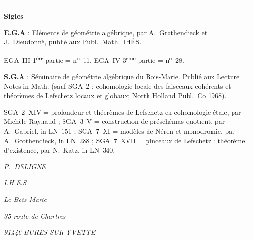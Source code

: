 \documentclass[12pt,a4paper]{article}
\theoremstyle{plain}
\theoremstyle{definition}
\theoremstyle{remark}
\begin{document}
\vspace{1em}

\begin{center}
\rule{0.6\textwidth}{0.4pt}
\end{center}

\vspace{0.5em}

\noindent\textbf{Sigles}

\medskip

\noindent\textbf{E.G.A} : Eléments de géométrie algébrique, par A.~Grothendieck et J.~Dieudonné, publié aux Publ.~Math.~IHÉS.

\noindent EGA~III 1\textsuperscript{ère} partie = n\textsuperscript{o}~11, EGA~IV 3\textsuperscript{ème} partie = n\textsuperscript{o}~28.

\medskip

\noindent\textbf{S.G.A} : Séminaire de géométrie algébrique du Bois-Marie. Publié aux Lecture Notes in Math. (sauf SGA~2 : cohomologie locale des faisceaux cohérents et théorèmes de Lefschetz locaux et globaux; North Holland Publ.~Co 1968).

\noindent SGA~2~XIV = profondeur et théorèmes de Lefschetz en cohomologie étale, par Michèle Raynaud ; SGA~3~V = construction de préschémas quotient, par A.~Gabriel, in LN~151 ; SGA~7~XI = modèles de Néron et monodromie, par A.~Grothendieck, in LN~288 ; SGA~7~XVII = pinceaux de Lefschetz : théorème d'existence, par N.~Katz, in LN~340.

\vspace{2em}

\begin{flushright}
\textit{P.~DELIGNE}

\textit{I.H.E.S}

\textit{Le Bois Marie}

\textit{35 route de Chartres}

\textit{91440 BURES SUR YVETTE}
\end{flushright}
\end{document}
